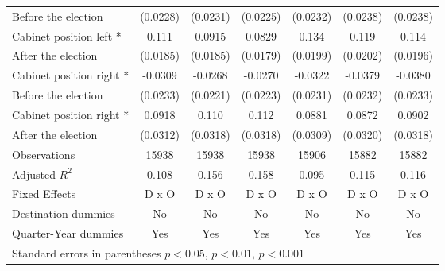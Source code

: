 \begin{table}[htbp]
\begin{tabular}{l*{6}{c}}
  Before the election                   &    (0.0228)         &    (0.0231)         &    (0.0225)         &    (0.0232)         &    (0.0238)         &    (0.0238)         \\
[0,5em]
Cabinet position left * &       0.111\sym{***}&      0.0915\sym{***}&      0.0829\sym{***}&       0.134\sym{***}&       0.119\sym{***}&       0.114\sym{***}\\
  After the election                  &    (0.0185)         &    (0.0185)         &    (0.0179)         &    (0.0199)         &    (0.0202)         &    (0.0196)         \\
[0,5em]
Cabinet position right *&     -0.0309         &     -0.0268         &     -0.0270         &     -0.0322         &     -0.0379         &     -0.0380         \\
  Before the election                   &    (0.0233)         &    (0.0221)         &    (0.0223)         &    (0.0231)         &    (0.0232)         &    (0.0233)         \\
[0,5em]
Cabinet position right * &      0.0918\sym{**} &       0.110\sym{**} &       0.112\sym{***}&      0.0881\sym{**} &      0.0872\sym{**} &      0.0902\sym{**} \\
 After the election                   &    (0.0312)         &    (0.0318)         &    (0.0318)         &    (0.0309)         &    (0.0320)         &    (0.0318)         \\
\hline
Observations        &       15938         &       15938         &       15938         &       15906         &       15882         &       15882         \\
Adjusted \(R^{2}\)  &       0.108         &       0.156         &       0.158         &       0.095         &       0.115         &       0.116         \\
Fixed Effects       &       D x O         &       D x O         &       D x O         &       D x O         &       D x O         &       D x O         \\
Destination dummies &          No         &          No         &          No         &          No         &          No         &          No         \\
Quarter-Year dummies&         Yes         &         Yes         &         Yes         &         Yes         &         Yes         &         Yes         \\
\hline\hline
\multicolumn{7}{l}{Standard errors in parentheses \sym{*} \(p<0.05\), \sym{**} \(p<0.01\), \sym{***} \(p<0.001\)}\\
\end{tabular}
\end{table}
